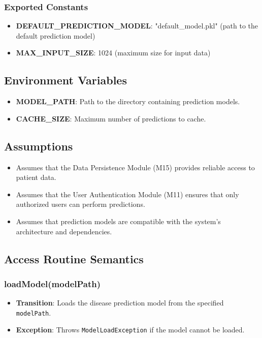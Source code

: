 \documentclass[12pt, titlepage]{article}
\begin{document}
\subsubsection{Exported Constants}
\begin{itemize}
    \item \textbf{DEFAULT\_PREDICTION\_MODEL}: "default\_model.pkl" (path to the default prediction model)
    \item \textbf{MAX\_INPUT\_SIZE}: 1024 (maximum size for input data)
\end{itemize}

\subsection{Environment Variables}
\begin{itemize}
    \item \textbf{MODEL\_PATH}: Path to the directory containing prediction models.
    \item \textbf{CACHE\_SIZE}: Maximum number of predictions to cache.
\end{itemize}

\subsection{Assumptions}
\begin{itemize}
    \item Assumes that the Data Persistence Module (M15) provides reliable access to patient data.
    \item Assumes that the User Authentication Module (M11) ensures that only authorized users can perform predictions.
    \item Assumes that prediction models are compatible with the system's architecture and dependencies.
\end{itemize}

\subsection{Access Routine Semantics}
\subsubsection{loadModel(modelPath)}

\begin{itemize}
    \item \textbf{Transition}: Loads the disease prediction model from the specified \texttt{modelPath}.
    \item \textbf{Exception}: Throws \texttt{ModelLoadException} if the model cannot be loaded.
\end{itemize}
\end{document}
